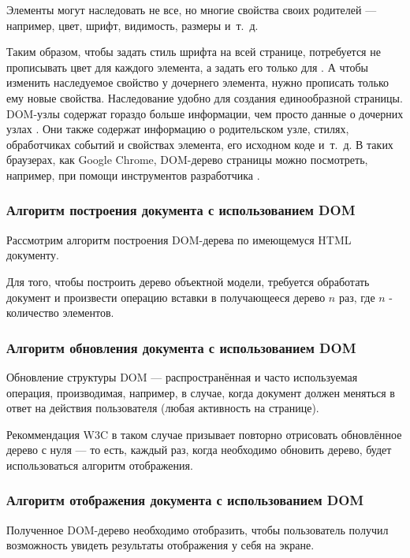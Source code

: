 \clearpage

Элементы могут наследовать не все, но многие свойства своих родителей --- например, цвет, шрифт, видимость, размеры и~т.~д.

Таким образом, чтобы задать стиль шрифта на всей странице, потребуется не прописывать цвет для каждого элемента, а задать его только для .
А чтобы изменить наследуемое свойство у дочернего элемента, нужно прописать только ему новые свойства.
Наследование удобно для создания единообразной страницы.
DOM-узлы содержат гораздо больше информации, чем просто данные о дочерних узлах \cite{dom-element}.
Они также содержат информацию о родительском узле, стилях, обработчиках событий и свойствах элемента, его исходном  коде и~т.~д.
В таких браузерах, как Google Chrome, DOM-дерево страницы можно посмотреть, например, при помощи инструментов разработчика \cite{devtools}.

\subsubsection{Алгоритм построения документа с использованием  DOM}


Рассмотрим алгоритм построения DOM-дерева по имеющемуся HTML документу.

Для того, чтобы построить дерево объектной модели, требуется обработать документ и произвести операцию вставки в получающееся дерево $n$ раз, где $n$ - количество элементов.

\subsubsection{Алгоритм обновления документа с использованием DOM}

Обновление структуры DOM --- распространённая и часто используемая операция, производимая, например, в случае, когда документ должен меняться в ответ на действия пользователя (любая активность на странице).

Рекоммендация W3C в таком случае призывает повторно отрисовать обновлённое дерево с нуля --- то есть, каждый раз, когда необходимо обновить дерево, будет использоваться алгоритм отображения.

\subsubsection{Алгоритм отображения документа с использованием DOM}

Полученное DOM-дерево необходимо отобразить, чтобы пользователь получил возможность увидеть результаты отображения у себя на экране.

